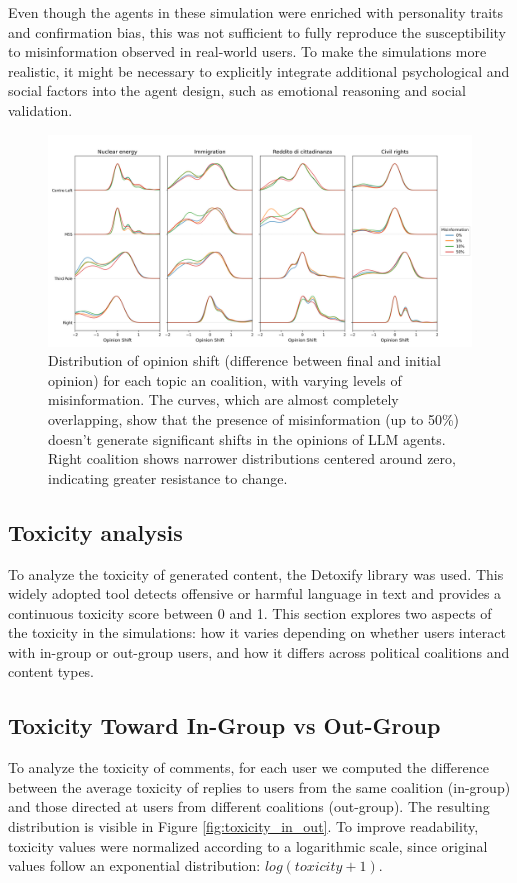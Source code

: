 Even though the agents in these simulation were enriched with personality traits and confirmation bias, this was not sufficient to fully reproduce the susceptibility to misinformation observed in real-world users.
To make the simulations more realistic, it might be necessary to explicitly integrate additional psychological and social factors into the agent design, such as emotional reasoning and social validation.


\begin{figure}[h]
    \centering
    \includegraphics[width=0.8\linewidth]{Images/Misinformation/score_llm_RandomRecSys.png}
    \caption{
    Distribution of opinion shift (difference between final and initial opinion) for each topic an coalition, with varying levels of misinformation.
    The curves, which are almost completely overlapping, show that the presence of misinformation (up to 50\%) doesn't generate significant shifts in the opinions of LLM agents.
    Right coalition shows narrower distributions centered around zero, indicating greater resistance to change.
    }
    \label{fig:misinfo_opinion_shift}
\end{figure}


\subsection{Toxicity analysis}
To analyze the toxicity of generated content, the Detoxify library \cite{hanu2020detoxify} was used. This widely adopted tool detects offensive or harmful language in text and provides a continuous toxicity score between 0 and 1.
This section explores two aspects of the toxicity in the simulations: how it varies depending on whether users interact with in-group or out-group users, and how it differs across political coalitions and content types.

\subsection{Toxicity Toward In-Group vs Out-Group}
To analyze the toxicity of comments, for each user we computed the difference between the average toxicity of replies to users from the same coalition (in-group) and those directed at users from different coalitions (out-group).
The resulting distribution is visible in Figure \ref{fig:toxicity_in_out}.
To improve readability, toxicity values were normalized according to a logarithmic scale, since original values follow an exponential distribution: $log(toxicity + 1)$.

